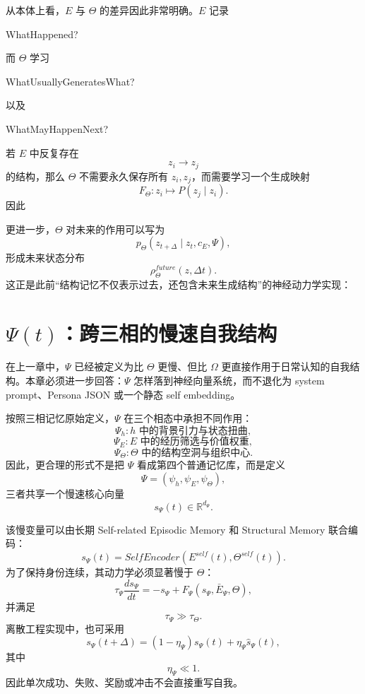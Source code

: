 从本体上看，$E$ 与 $\Theta$ 的差异因此非常明确。$E$ 记录
\begin{statementbox}
WhatHappened?
\end{statementbox}
而 $\Theta$ 学习
\begin{statementbox}
WhatUsuallyGeneratesWhat?
\end{statementbox}
以及
\begin{statementbox}
WhatMayHappenNext?
\end{statementbox}
若 $E$ 中反复存在
\[
z_i\rightarrow z_j
\]
的结构，那么 $\Theta$ 不需要永久保存所有 $z_i,z_j$，而需要学习一个生成映射
\[
F_\Theta:
z_i
\mapsto
P(z_j\mid z_i).
\]
因此
\begin{statementbox}
\centering
{}
\end{statementbox}

更进一步，$\Theta$ 对未来的作用可以写为
\[
p_\Theta
\left(
z_{t+\Delta}
\mid
z_t,c_E,\Psi
\right),
\]
形成未来状态分布
\[
\rho_\Theta^{future}(z,\Delta t).
\]
这正是此前“结构记忆不仅表示过去，还包含未来生成结构”的神经动力学实现：
\begin{statementbox}
\centering
{}
\end{statementbox}

\section{$\Psi(t)$：跨三相的慢速自我结构}

在上一章中，$\Psi$ 已经被定义为比 $\Theta$ 更慢、但比 $\Omega$ 更直接作用于日常认知的自我结构。本章必须进一步回答：$\Psi$ 怎样落到神经向量系统，而不退化为 system prompt、Persona JSON 或一个静态 self embedding。

按照三相记忆原始定义，$\Psi$ 在三个相态中承担不同作用：
\[
\Psi_h:
\text{$h$ 中的背景引力与状态扭曲},
\]
\[
\Psi_E:
\text{$E$ 中的经历筛选与价值权重},
\]
\[
\Psi_\Theta:
\text{$\Theta$ 中的结构空洞与组织中心}.
\]
因此，更合理的形式不是把 $\Psi$ 看成第四个普通记忆库，而是定义
\[
\Psi
=
\left(
\psi_h,\psi_E,\psi_\Theta
\right),
\]
三者共享一个慢速核心向量
\[
s_\Psi(t)
\in
\mathbb{R}^{d_\Psi}.
\]

该慢变量可以由长期 Self-related Episodic Memory 和 Structural Memory 联合编码：
\[
s_\Psi(t)
=
SelfEncoder
\left(
E^{self}(t),
\Theta^{self}(t)
\right).
\]
为了保持身份连续，其动力学必须显著慢于 $\Theta$：
\[
\tau_\Psi
\frac{ds_\Psi}{dt}
=
-s_\Psi
+
F_\Psi
\left(
s_\Psi,\bar E_\Psi,\Theta
\right),
\]
并满足
\[
\tau_\Psi\gg\tau_\Theta.
\]
离散工程实现中，也可采用
\[
s_\Psi(t+\Delta)
=
(1-\eta_\Psi)s_\Psi(t)
+
\eta_\Psi\widehat{s}_\Psi(t),
\]
其中
\[
\eta_\Psi\ll1.
\]
因此单次成功、失败、奖励或冲击不会直接重写自我。

